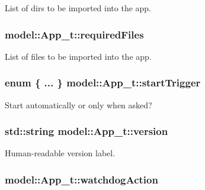 List of dirs to be imported into the app. 

\subsubsection[{\texorpdfstring{required\+Files}{requiredFiles}}]{ model\+::\+App\+\_\+t\+::required\+Files}\hypertarget{structmodel_1_1_app__t_a6dc066b5afe80efee6201a489583e505}{}\label{structmodel_1_1_app__t_a6dc066b5afe80efee6201a489583e505}


List of files to be imported into the app. 

\subsubsection[{\texorpdfstring{start\+Trigger}{startTrigger}}]{\setlength{\rightskip}{0pt plus 5cm}enum \{ ... \}   model\+::\+App\+\_\+t\+::start\+Trigger}\hypertarget{structmodel_1_1_app__t_ab7ccd00b0c7976dfa1e09770d48d9ad6}{}\label{structmodel_1_1_app__t_ab7ccd00b0c7976dfa1e09770d48d9ad6}


Start automatically or only when asked? 

\subsubsection[{\texorpdfstring{version}{version}}]{\setlength{\rightskip}{0pt plus 5cm}std\+::string model\+::\+App\+\_\+t\+::version}\hypertarget{structmodel_1_1_app__t_adc39f541349ac8b442cf333042305960}{}\label{structmodel_1_1_app__t_adc39f541349ac8b442cf333042305960}


Human-\/readable version label. 

\subsubsection[{\texorpdfstring{watchdog\+Action}{watchdogAction}}]{ model\+::\+App\+\_\+t\+::watchdog\+Action}\hypertarget{structmodel_1_1_app__t_a8de51fb11e6a6a74b85e1251b04ee0d0}{}\label{structmodel_1_1_app__t_a8de51fb11e6a6a74b85e1251b04ee0d0}
